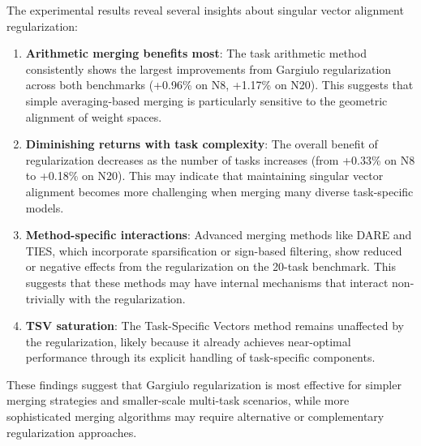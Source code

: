 The experimental results reveal several insights about singular vector alignment regularization:

\begin{enumerate}
    \item \textbf{Arithmetic merging benefits most}: The task arithmetic method consistently shows the largest improvements from Gargiulo regularization across both benchmarks (+0.96\% on N8, +1.17\% on N20). This suggests that simple averaging-based merging is particularly sensitive to the geometric alignment of weight spaces.

    \item \textbf{Diminishing returns with task complexity}: The overall benefit of regularization decreases as the number of tasks increases (from +0.33\% on N8 to +0.18\% on N20). This may indicate that maintaining singular vector alignment becomes more challenging when merging many diverse task-specific models.

    \item \textbf{Method-specific interactions}: Advanced merging methods like DARE and TIES, which incorporate sparsification or sign-based filtering, show reduced or negative effects from the regularization on the 20-task benchmark. This suggests that these methods may have internal mechanisms that interact non-trivially with the regularization.

    \item \textbf{TSV saturation}: The Task-Specific Vectors method remains unaffected by the regularization, likely because it already achieves near-optimal performance through its explicit handling of task-specific components.
\end{enumerate}

These findings suggest that Gargiulo regularization is most effective for simpler merging strategies and smaller-scale multi-task scenarios, while more sophisticated merging algorithms may require alternative or complementary regularization approaches.
